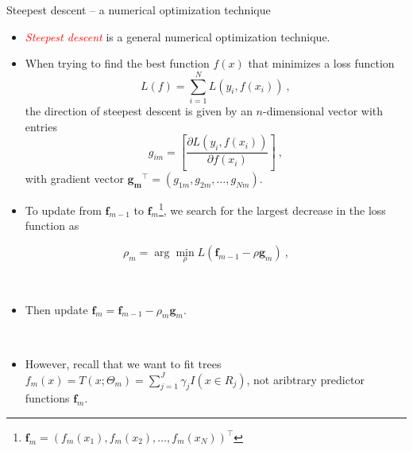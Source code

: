 \documentclass[
  10pt,
  ignorenonframetext,
]{beamer}
\providecommand{\tightlist}{%
  \setlength{\itemsep}{0pt}\setlength{\parskip}{0pt}}
\begin{document}
\begin{frame}
\begin{block}{Steepest descent -- a numerical optimization technique}
\protect\hypertarget{steepest-descent-a-numerical-optimization-technique}{}
\(~\)

\begin{itemize}
\tightlist
\item
  \emph{\textcolor{red}{Steepest descent}} is a general numerical
  optimization technique.
\end{itemize}

\vspace{2mm}

\begin{itemize}
\tightlist
\item
  When trying to find the best function \(f(x)\) that minimizes a loss
  function \[L(f) = \sum_{i=1}^N L(y_i,f(x_i)) \ ,\] the direction of
  steepest descent is given by an \(n\)-dimensional vector with entries
  \[g_{im} = \left[ \frac{\partial L(y_i,f(x_i))}{\partial f(x_i)} \right] \ ,\]
  with gradient vector
  \(\mathbf{g_m}^\top = (g_{1m},g_{2m},\ldots, g_{Nm})\).
\end{itemize}
\end{block}
\end{frame}

\begin{frame}
\begin{itemize}
\tightlist
\item
  To update from \(\mathbf{f}_{m-1}\) to
  \(\mathbf{f}_m\)\footnote{$\mathbf{f}_m = (f_m(x_1),f_m(x_2),\ldots, f_m(x_N))^\top$ },
  we search for the largest decrease in the loss function as
\end{itemize}

\[\rho_m = \arg \min_\rho L(\mathbf{f}_{m-1} - \rho \mathbf{g}_m) \ , \]

\(~\)

\begin{itemize}
\tightlist
\item
  Then update \(\mathbf{f}_m = \mathbf{f}_{m-1} - \rho_m \mathbf{g}_m\).
\end{itemize}

\(~\)

\pause

\begin{itemize}
\tightlist
\item
  However, recall that we want to fit trees
  \(f_m(x)=T(x;\Theta_m)=\sum_{j=1}^J \gamma_j I(x\in R_j)\), not
  aribtrary predictor functions \(\mathbf{f}_m\).
\end{itemize}
\end{frame}
\end{document}
